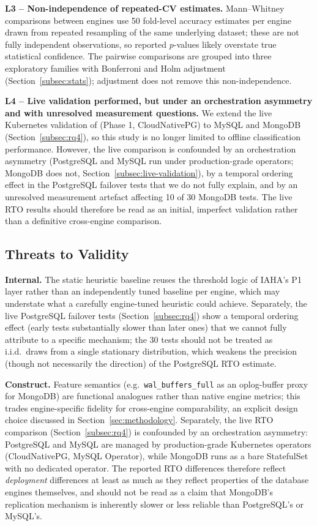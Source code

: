 \documentclass[iicol,pdflatex,sn-mathphys-num]{sn-jnl}
\theoremstyle{thmstyleone}
\theoremstyle{thmstylethree}
\begin{document}
\textbf{L3 -- Non-independence of repeated-CV estimates.} Mann--Whitney
comparisons between engines use 50 fold-level accuracy estimates per
engine drawn from repeated resampling of the same underlying dataset;
these are not fully independent observations, so reported $p$-values
likely overstate true statistical confidence. The pairwise comparisons
are grouped into three exploratory families with Bonferroni and Holm
adjustment (Section~\ref{subsec:stats}); adjustment does not remove this
non-independence.

\textbf{L4 -- Live validation performed, but under an orchestration
asymmetry and with unresolved measurement questions.} We extend the
live Kubernetes validation of \cite{iaha2026} (Phase 1, CloudNativePG)
to MySQL and MongoDB (Section~\ref{subsec:rq4}), so this study is no
longer limited to offline classification performance. However, the
live comparison is confounded by an orchestration asymmetry
(PostgreSQL and MySQL run under production-grade operators; MongoDB
does not, Section~\ref{subsec:live-validation}), by a temporal
ordering effect in the PostgreSQL failover tests that we do not fully
explain, and by an unresolved measurement artefact affecting 10 of 30
MongoDB tests. The live RTO results should therefore be read as an
initial, imperfect validation rather than a definitive cross-engine
comparison.

\subsection{Threats to Validity}\label{subsec:threats}

\textbf{Internal.} The static heuristic baseline reuses the threshold
logic of IAHA's P1 layer rather than an independently tuned baseline
per engine, which may understate what a carefully engine-tuned
heuristic could achieve. Separately, the live PostgreSQL failover
tests (Section~\ref{subsec:rq4}) show a temporal ordering effect
(early tests substantially slower than later ones) that we cannot
fully attribute to a specific mechanism; the 30 tests should not be
treated as i.i.d.\ draws from a single stationary distribution, which
weakens the precision (though not necessarily the direction) of the
PostgreSQL RTO estimate.

\textbf{Construct.} Feature semantics (e.g.\ \texttt{wal\_buffers\_full}
as an oplog-buffer proxy for MongoDB) are functional analogues rather
than native engine metrics; this trades engine-specific fidelity for
cross-engine comparability, an explicit design choice discussed in
Section~\ref{sec:methodology}. Separately, the live RTO comparison
(Section~\ref{subsec:rq4}) is confounded by an orchestration
asymmetry: PostgreSQL and MySQL are managed by production-grade
Kubernetes operators (CloudNativePG, MySQL Operator), while MongoDB
runs as a bare StatefulSet with no dedicated operator. The reported
RTO differences therefore reflect \emph{deployment} differences at
least as much as they reflect properties of the database engines
themselves, and should not be read as a claim that MongoDB's
replication mechanism is inherently slower or less reliable than
PostgreSQL's or MySQL's.
\end{document}
